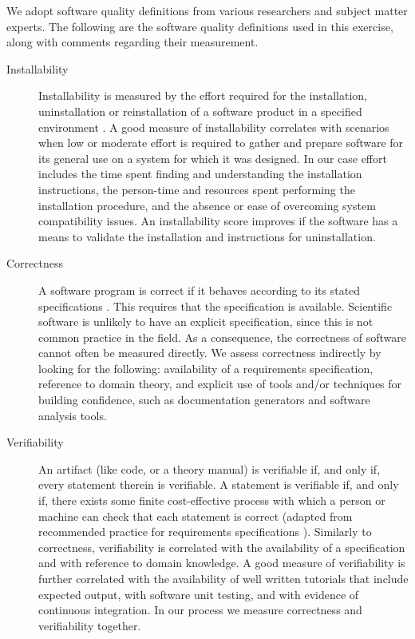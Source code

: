 \documentclass[final, 3p, times, authoryear]{elsarticle}
\begin{document}
We adopt software quality definitions from various researchers and subject
matter experts. The following are the software quality definitions used in this
exercise, along with comments regarding their measurement.

\begin{description}

	\item[Installability] Installability is measured by the effort required for
	the installation, uninstallation or reinstallation of a software product in
	a specified environment \citep{ISO/IEC25010, lenhard2013measuring}. A good
	measure of installability correlates with scenarios when low or moderate
	effort is required to gather and prepare software for its general use on a
	system for which it was designed. In our case effort includes the time spent
	finding and understanding the installation instructions, the person-time and
	resources spent performing the installation procedure, and the absence or
	ease of overcoming system compatibility issues. An installability score
	improves if the software has a means to validate the installation and
	instructions for uninstallation.
	
	\item[Correctness] A software program is correct if it behaves according to
	its stated specifications \citep{GhezziEtAl2003}. This requires that the
	specification is available. Scientific software is unlikely to have an
	explicit specification, since this is not common practice in the field. As a
	consequence, the correctness of software cannot often be measured directly.
	We assess correctness indirectly by looking for the following: availability
	of a requirements specification, reference to domain theory, and explicit
	use of tools and/or techniques for building confidence, such as
	documentation generators and software analysis tools.
	
	\item[Verifiability] An artifact (like code, or a theory manual) is
	verifiable if, and only if, every statement therein is verifiable. A
	statement is verifiable if, and only if, there exists some finite
	cost-effective process with which a person or machine can check that each
	statement is correct (adapted from recommended practice for requirements
	specifications \citep{IEEE1998}). Similarly to correctness, verifiability is
	correlated with the availability of a specification and with reference to
	domain knowledge. A good measure of verifiability is further correlated with
	the availability of well written tutorials that include expected output,
	with software unit testing, and with evidence of continuous integration. In
	our process we measure correctness and verifiability together.
	

\end{description}
\end{document}
